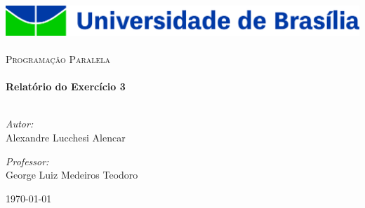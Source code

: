 \begin{titlepage}

\begin{center}

\includegraphics[width=1.0\textwidth]{img/unb_logo.jpg}~\\[1cm]

\textsc{\Large Programação Paralela}\\[0.5cm]

\HRule\\[0.4cm]
{\huge \bfseries Relatório do Exercício 3\\[0.4cm]}
\HRule\\[1.5cm]

\begin{minipage}{0.4\textwidth}
\begin{flushleft} \large
\textit{Autor:}\\
\small{Alexandre Lucchesi Alencar}
\end{flushleft}
\end{minipage}
\begin{minipage}{0.4\textwidth}
\begin{flushright} \large
\textit{Professor:}\\
\small{George Luiz Medeiros Teodoro}
\end{flushright}
\end{minipage}

\vfill

{\large \today}

\end{center}

\end{titlepage}

